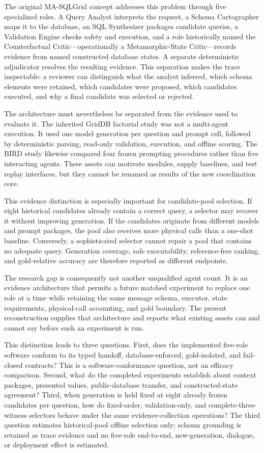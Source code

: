 \documentclass[applsci,article,submit,moreauthors]{Definitions/mdpi}
\newcommand{\masql}{MA-SQLGrid}
\begin{document}
The original \masql{} concept addresses this problem through five specialized roles. A Query Analyst interprets the request, a Schema Cartographer maps it to the database, an SQL Synthesizer packages candidate queries, a Validation Engine checks safety and execution, and a role historically named the Counterfactual Critic---operationally a Metamorphic-State Critic---records evidence from named constructed database states. A separate deterministic adjudicator resolves the resulting evidence. This separation makes the trace inspectable: a reviewer can distinguish what the analyst inferred, which schema elements were retained, which candidates were proposed, which candidates executed, and why a final candidate was selected or rejected.

The architecture must nevertheless be separated from the evidence used to evaluate it. The inherited GridDB factorial study was not a multi-agent execution. It used one model generation per question and prompt cell, followed by deterministic parsing, read-only validation, execution, and offline scoring. The BIRD study likewise compared four frozen prompting procedures rather than five interacting agents. These assets can motivate modules, supply baselines, and test replay interfaces, but they cannot be renamed as results of the new coordination core.

This evidence distinction is especially important for candidate-pool selection. If eight historical candidates already contain a correct query, a selector may recover it without improving generation. If the candidates originate from different models and prompt packages, the pool also receives more physical calls than a one-shot baseline. Conversely, a sophisticated selector cannot repair a pool that contains no adequate query. Generation coverage, safe executability, reference-free ranking, and gold-relative accuracy are therefore reported as different endpoints.

The research gap is consequently not another unqualified agent count. It is an evidence architecture that permits a future matched experiment to replace one role at a time while retaining the same message schema, executor, state requirements, physical-call accounting, and gold boundary. The present reconstruction supplies that architecture and reports what existing assets can and cannot say before such an experiment is run.

This distinction leads to three questions. First, does the implemented five-role software conform to its typed handoff, database-enforced, gold-isolated, and fail-closed contracts? This is a software-conformance question, not an efficacy comparison. Second, what do the completed experiments establish about context packages, presented values, public-database transfer, and constructed-state agreement? Third, when generation is held fixed at eight already frozen candidates per question, how do fixed-order, validation-only, and complete-three-witness selectors behave under the same evidence-collection operations? The third question estimates historical-pool offline selection only; schema grounding is retained as trace evidence and no five-role end-to-end, new-generation, dialogue, or deployment effect is estimated.
\end{document}
